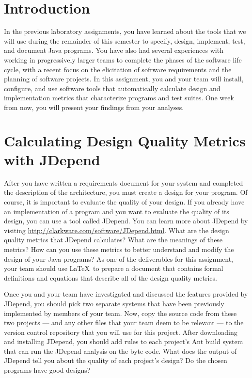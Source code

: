 

\usepackage[compact]{titlesec}



\section*{Introduction}

In the previous laboratory assignments, you have learned about the tools that we will use during the remainder of this
semester to specify, design, implement, test, and document Java programs.  You have also had several experiences with
working in progressively larger teams to complete the phases of the software life cycle, with a recent focus on the
elicitation of software requirements and the planning of software projects.  In this assignment, you and your team will
install, configure, and use software tools that automatically calculate design and implementation metrics that
characterize programs and test suites.  One week from now, you will present your findings from your analyses.  

\section*{Calculating Design Quality Metrics with JDepend}

After you have written a requirements document for your system and completed the description of the architecture, you
must create a design for your program.  Of course, it is important to evaluate the quality of your design.  If you
already have an implementation of a program and you want to evaluate the quality of its design, you can use a tool
called JDepend.  You can learn more about JDepend by visiting \url{http://clarkware.com/software/JDepend.html}. What are
the design quality metrics that JDepend calculates? What are the meanings of these metrics? How can you use these
metrics to better understand and modify the design of your Java programs? As one of the deliverables for this
assignment, your team should use \LaTeX\ to prepare a document that contains formal definitions and equations that
describe all of the design quality metrics. 

Once you and your team have investigated and discussed the features provided by JDepend, you should pick two separate
systems that have been previously implemented by members of your team. Now, copy the source code from these two projects
--- and any other files that your team deem to be relevant --- to the version control repository that you will use for
this project.  After downloading and installing JDepend, you should add rules to each project's Ant build system that
can run the JDepend analysis on the byte code. What does the output of JDepend tell you about the quality of each
project's design? Do the chosen programs have good designs?

